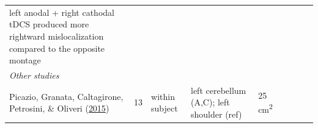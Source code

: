 \documentclass[11pt,]{memoir}
\begin{document}
\begin{longtable}[]{@{}lllllllll@{}}
\begin{minipage}[t]{0.24\columnwidth}
left anodal + right cathodal tDCS produced more rightward
mislocalization compared to the opposite montage\strut
\end{minipage}\tabularnewline
\begin{minipage}[t]{0.09\columnwidth}\raggedright
\emph{Other studies}\strut
\end{minipage} & \begin{minipage}[t]{0.02\columnwidth}\raggedright
\strut
\end{minipage} & \begin{minipage}[t]{0.04\columnwidth}\raggedright
\strut
\end{minipage} & \begin{minipage}[t]{0.10\columnwidth}\raggedright
\strut
\end{minipage} & \begin{minipage}[t]{0.03\columnwidth}\raggedright
\strut
\end{minipage} & \begin{minipage}[t]{0.05\columnwidth}\raggedright
\strut
\end{minipage} & \begin{minipage}[t]{0.04\columnwidth}\raggedright
\strut
\end{minipage} & \begin{minipage}[t]{0.15\columnwidth}\raggedright
\strut
\end{minipage} & \begin{minipage}[t]{0.24\columnwidth}\raggedright
\strut
\end{minipage}\tabularnewline
\begin{minipage}[t]{0.09\columnwidth}\raggedright
Picazio, Granata, Caltagirone, Petrosini, \& Oliveri (\protect\hyperlink{ref-Picazio2015}{2015})\strut
\end{minipage} & \begin{minipage}[t]{0.02\columnwidth}\raggedright
13\strut
\end{minipage} & \begin{minipage}[t]{0.04\columnwidth}\raggedright
within
subject\strut
\end{minipage} & \begin{minipage}[t]{0.10\columnwidth}\raggedright
left cerebellum (A,C);
left shoulder (ref)\strut
\end{minipage} & \begin{minipage}[t]{0.03\columnwidth}\raggedright
25
cm\textsuperscript{2}\strut
\end{minipage} & \begin{minipage}[t]{0.05\columnwidth}\raggedright

\end{minipage}
\end{longtable}
\end{document}
